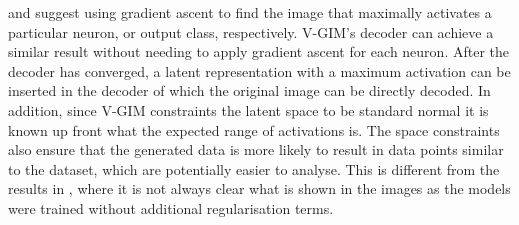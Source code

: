 \cite{erhanVisualizingHigherLayerFeatures2009} and \cite{simonyanDeepConvolutionalNetworks2014} suggest using gradient ascent to find the image that maximally activates a particular neuron, or output class, respectively. V-GIM's decoder can achieve a similar result without needing to apply gradient ascent for each neuron. After the decoder has converged, a latent representation with a maximum activation can be inserted in the decoder of which the original image can be directly decoded. In addition, since V-GIM constraints the latent space to be standard normal it is known up front what the expected range of activations is. The space constraints also ensure that the generated data is more likely to result in data points similar to the dataset, which are potentially easier to analyse. This is different from the results in \cite{erhanVisualizingHigherLayerFeatures2009, simonyanDeepConvolutionalNetworks2014}, where it is not always clear what is shown in the images as the models were trained without additional regularisation terms. 








